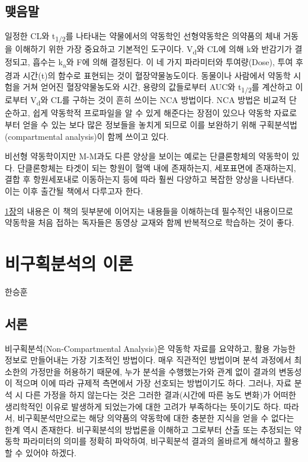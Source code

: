 \documentclass[
  11pt,
  krantz2, a4paper, twoside]{krantz}
\theoremstyle{definition}
\theoremstyle{definition}
\theoremstyle{definition}
\theoremstyle{definition}
\theoremstyle{remark}
\begin{document}
\section{맺음말}\label{uxb9fauxc74cuxb9d0}

일정한 CL와 t\textsubscript{1/2}를 나타내는 약물에서의 약동학인 선형약동학은 의약품의 체내 거동을 이해하기 위한 가장 중요하고 기본적인 도구이다. 
V\textsubscript{d}와 CL에 의해 k와 반감기가 결정되고, 흡수는 k\textsubscript{a}와 F에 의해 결정된다. 
이 네 가지 파라미터와 투여량(Dose), 투여 후 경과 시간(t)의 함수로 표현되는 것이 혈장약물농도이다.
동물이나 사람에서 약동학 시험을 거쳐 얻어진 혈장약물농도와 시간, 용량의 값들로부터 AUC와 t\textsubscript{1/2}를 계산하고 이로부터 V\textsubscript{d}와 CL를 구하는 것이 흔히 쓰이는 NCA 방법이다. 
NCA 방법은 비교적 단순하고, 쉽게 약동학적 프로파일을 알 수 있게 해준다는 장점이 있으나 약동학 자료로부터 얻을 수 있는 보다 많은 정보들을 놓치게 되므로 이를 보완하기 위해 구획분석법(compartmental analysis)이 함께 쓰이고 있다.

비선형 약동학이지만 M-M과도 다른 양상을 보이는 예로는 단클론항체의 약동학이 있다. 
단클론항체는 타겟이 되는 항원이 혈액 내에 존재하는지, 세포표면에 존재하는지, 결합 후 항원세포내로 이동하는지 등에 따라 훨씬 다양하고 복잡한 양상을 나타낸다. 
이는 이후 출간될 책에서 다루고자 한다.

\hyperref[principle]{1장}의 내용은 이 책의 뒷부분에 이어지는 내용들을 이해하는데 필수적인 내용이므로 약동학을 처음 접하는 독자들은 동영상 교재와 함께 반복적으로 학습하는 것이 좋다.

\chapter{비구획분석의 이론}\label{nca-principle}

\Large\hfill

한승훈
\normalsize

\section{서론}\label{uxc11cuxb860-1}

비구획분석(Non-Compartmental Analysis)은 약동학 자료를 요약하고, 활용 가능한 정보로 만들어내는 가장 기초적인 방법이다. 
매우 직관적인 방법이며 분석 과정에서 최소한의 가정만을 허용하기 때문에, 누가 분석을 수행했는가와 관계 없이 결과의 변동성이 적으며 이에 따라 규제적 측면에서 가장 선호되는 방법이기도 하다.
그러나, 자료 분석 시 다른 가정을 하지 않는다는 것은 그러한 결과(시간에 따른 농도 변화)가 어떠한 생리학적인 이유로 발생하게 되었는가에 대한 고려가 부족하다는 뜻이기도 하다. 
따라서, 비구획분석만으로는 해당 의약품의 약동학에 대한 충분한 지식을 얻을 수 없다는 한계 역시 존재한다. 
비구획분석의 방법론을 이해하고 그로부터 산출 또는 추정되는 약동학 파라미터의 의미를 정확히 파악하여, 비구획분석 결과의 올바르게 해석하고 활용할 수 있어야 하겠다.
\end{document}
